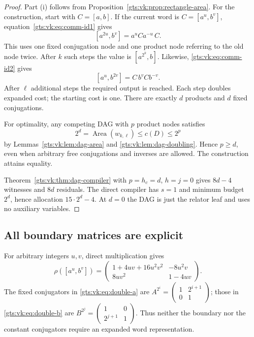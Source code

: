 \documentclass[11pt,letterpaper]{article}
\theoremstyle{definition}
\theoremstyle{remark}
\newcommand{\Area}{\operatorname{Area}}
\newcommand{\smallmat}[4]{\begin{pmatrix}#1&#2\\#3&#4\end{pmatrix}}
\begin{document}
\begin{proof}
Part (i) follows from Proposition~\ref{gts:vk:prop:rectangle-area}.
For the construction, start with $C=[a,b]$. If the current word is
$C=[a^u,b^v]$, equation~\eqref{gts:vk:eq:comm-id1} gives
\begin{equation}\label{gts:vk:eq:double-a}
 [a^{2u},b^v]=a^uCa^{-u}\,C.
\end{equation}
This uses one fixed conjugation node and one product node referring to the old node twice. After $k$ such steps the value is $[a^{2^k},b]$.
Likewise, \eqref{gts:vk:eq:comm-id2} gives
\begin{equation}\label{gts:vk:eq:double-b}
 [a^u,b^{2v}]=C\,b^vCb^{-v}.
\end{equation}
After $\ell$ additional steps the required output is reached. Each step doubles expanded cost; the starting cost is one. There are exactly $d$ products and $d$ fixed conjugations.

For optimality, any competing DAG with $p$ product nodes satisfies
\[
 2^d=\Area(w_{k,\ell})\leq c(D)\leq2^p
\]
by Lemmas~\ref{gts:vk:lem:dag-area} and \ref{gts:vk:lem:dag-doubling}. Hence $p\geq d$, even when arbitrary free conjugations and inverses are allowed. The construction attains equality.

Theorem~\ref{gts:vk:thm:dag-compiler} with $p=h_c=d$, $h=j=0$ gives $8d-4$ witnesses and $8d$ residuals. The direct compiler has $s=1$ and minimum budget $2^d$, hence allocation $15\cdot2^d-4$. At $d=0$ the DAG is just the relator leaf and uses no auxiliary variables.
\end{proof}

\subsection{All boundary matrices are explicit}

For arbitrary integers $u,v$, direct multiplication gives
\begin{equation}\label{gts:vk:eq:rectangle-matrix}
 \rho([a^u,b^v])=
 \begin{pmatrix}
 1+4uv+16u^2v^2&-8u^2v\\
 8uv^2&1-4uv
 \end{pmatrix}.
\end{equation}
The fixed conjugators in \eqref{gts:vk:eq:double-a} are
$A^{2^i}=\smallmat{1}{2^{i+1}}{0}{1}$; those in
\eqref{gts:vk:eq:double-b} are
$B^{2^j}=\smallmat{1}{0}{2^{j+1}}{1}$.
Thus neither the boundary nor the constant conjugators require an expanded word representation.
\end{document}
